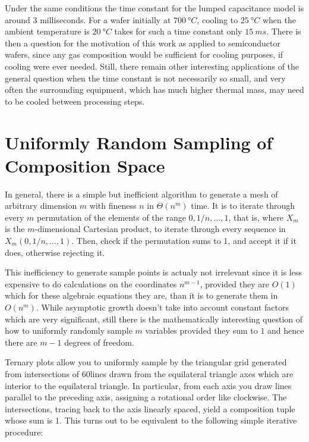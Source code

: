 \documentclass{article}
\begin{document}
Under the same conditions the time constant for the lumped capacitance model is
around 3 milliseconds. For a wafer initially at $\SI{700}{\degree C}$, cooling
to $\SI{25}{\degree C}$ when the ambient temperature is $\SI{20}{\degree C}$
takes for such a time constant only $\SI{15}{ms}$. There is then a question for
the motivation of this work as applied to semiconductor wafers, since any gas
composition would be sufficient for cooling purposes, if cooling were ever
needed. Still, there remain other interesting applications of the general
question when the time constant is not necessarily so small, and very often the
surrounding equipment, which has much higher thermal mass, may need to be
cooled between processing steps.

\section{Uniformly Random Sampling of Composition Space}

In general, there is a simple but inefficient algorithm to generate
a mesh of arbitrary dimension $m$ with fineness $n$ in $\Theta(n^m)$
time. It is to iterate through every $m$ permutation of the elements
of the range $0, 1/n, \ldots, 1$, that is, where $X_m$ is the
$m$-dimensional Cartesian product, to iterate through every sequence in
$X_m (0, 1/n, \ldots, 1)$. Then, check if the permutation sums to 1, and
accept it if it does, otherwise rejecting it.

This inefficiency to generate sample points is actualy not irrelevant
since it is less expensive to do calculations on the coordinates
$n^{m-1}$, provided they are $O(1)$ which for these algebraic equations
they are, than it is to generate them in $O(n^m)$. While asymptotic
growth doesn't take into account constant factors which are very
significant, still there is the mathematically interesting question of
how to uniformly randomly sample $m$ variables provided they sum to $1$
and hence there are $m-1$ degrees of freedom. 

Ternary plots allow you to uniformly sample by the triangular grid
generated from intersections of 60\degree lines drawn from the
equilateral triangle axes which are interior to the equilateral triangle.
In particular, from each axis you draw lines parallel to the preceding
axis, assigning a rotational order like clockwise. The intersections,
tracing back to the axis linearly spaced, yield a composition tuple
whose sum is 1. This turns out to be equivalent to the following simple
iterative procedure:
\end{document}
